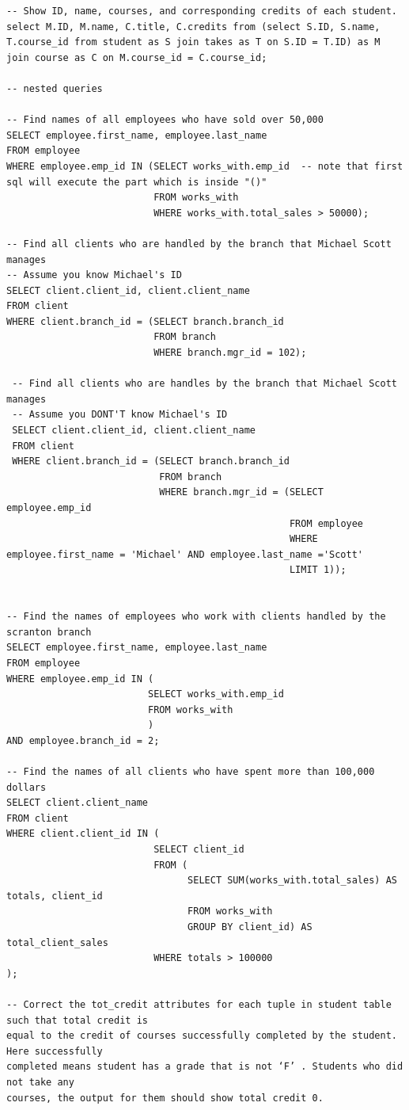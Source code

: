 \documentclass[8pt, a4paper, oneside, twocolumn]{extarticle}
\begin{document}
\begin{verbatim}
-- Show ID, name, courses, and corresponding credits of each student.
select M.ID, M.name, C.title, C.credits from (select S.ID, S.name, T.course_id from student as S join takes as T on S.ID = T.ID) as M join course as C on M.course_id = C.course_id;

-- nested queries

-- Find names of all employees who have sold over 50,000
SELECT employee.first_name, employee.last_name
FROM employee
WHERE employee.emp_id IN (SELECT works_with.emp_id  -- note that first sql will execute the part which is inside "()"
                          FROM works_with
                          WHERE works_with.total_sales > 50000);

-- Find all clients who are handled by the branch that Michael Scott manages
-- Assume you know Michael's ID
SELECT client.client_id, client.client_name
FROM client
WHERE client.branch_id = (SELECT branch.branch_id
                          FROM branch
                          WHERE branch.mgr_id = 102);

 -- Find all clients who are handles by the branch that Michael Scott manages
 -- Assume you DONT'T know Michael's ID
 SELECT client.client_id, client.client_name
 FROM client
 WHERE client.branch_id = (SELECT branch.branch_id
                           FROM branch
                           WHERE branch.mgr_id = (SELECT employee.emp_id
                                                  FROM employee
                                                  WHERE employee.first_name = 'Michael' AND employee.last_name ='Scott'
                                                  LIMIT 1));


-- Find the names of employees who work with clients handled by the scranton branch
SELECT employee.first_name, employee.last_name
FROM employee
WHERE employee.emp_id IN (
                         SELECT works_with.emp_id
                         FROM works_with
                         )
AND employee.branch_id = 2;

-- Find the names of all clients who have spent more than 100,000 dollars
SELECT client.client_name
FROM client
WHERE client.client_id IN (
                          SELECT client_id
                          FROM (
                                SELECT SUM(works_with.total_sales) AS totals, client_id
                                FROM works_with
                                GROUP BY client_id) AS total_client_sales
                          WHERE totals > 100000
);

-- Correct the tot_credit attributes for each tuple in student table such that total credit is
equal to the credit of courses successfully completed by the student. Here successfully
completed means student has a grade that is not ‘F’ . Students who did not take any
courses, the output for them should show total credit 0.


\end{verbatim}
\end{document}
